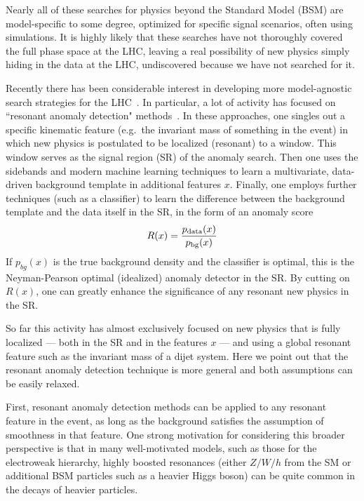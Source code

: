 \documentclass[prd, twocolumn, superscriptaddress,floatfix, nofootinbib, preprintnumbers]{revtex4-2}
\begin{document}
Nearly all of these searches for physics beyond the Standard Model (BSM) are model-specific to some degree, optimized for specific signal scenarios, often using simulations. It is highly likely that these searches have not thoroughly covered the full phase space at the LHC, leaving a real possibility of new physics simply hiding in the data at the LHC, undiscovered because we have not searched for it. 



Recently there has been considerable interest in developing more model-agnostic search strategies for the LHC~\cite{Karagiorgi:2021ngt,Kasieczka:2021xcg,Aarrestad:2021oeb}. In particular, a lot of activity has focused on ``resonant anomaly detection" methods~\cite{Collins:2018epr,Collins:2019jip,Nachman:2020lpy,Andreassen:2020nkr,Amram:2020ykb,ATLAS:2020iwa,Benkendorfer:2020gek,Stein:2020rou,Park:2020pak,Collins:2021nxn,Hallin:2021wme,Kamenik:2022qxs,Raine:2022hht,Kasieczka:2022naq,Hallin:2022eoq,Chen:2022suv,Golling:2022nkl,Golling:2023yjq,sengupta2023curtains}. 
In these approaches, one singles out a specific kinematic feature (e.g.\ the invariant mass of something in the event) in which new physics is postulated to be localized (resonant) to a window. This window serves as the signal region (SR) of the anomaly search. Then one uses the sidebands and modern machine learning techniques to learn a  multivariate, data-driven background template in additional features $x$. Finally, one employs further techniques (such as a classifier) to learn the difference between the background template and the data itself in the SR, in the form of an anomaly score 
\begin{equation}\label{eq:anomalyscore}
R(x) = \frac{p_{\rm data}(x)}{p_{\rm bg}(x)}
\end{equation}
If $p_{bg}(x)$ is the true background density and the classifier is optimal, this is the Neyman-Pearson optimal (idealized) anomaly detector in the SR. By cutting on $R(x)$, one can greatly enhance the significance of any resonant new physics in the SR. 

So far this activity has almost exclusively focused on new physics that is fully localized --- both in the SR and in the features $x$ --- and
using a global resonant feature such as the invariant mass of a dijet system.
Here we point out that the resonant anomaly detection technique is more general and both assumptions can be easily relaxed.

First, resonant anomaly detection methods can be applied to any resonant feature in the event, as long as the background satisfies the assumption of smoothness in that feature. One strong motivation for considering this broader perspective is that in many well-motivated models, such as those for the electroweak hierarchy, highly boosted resonances (either $Z/W/h$ from the SM or additional BSM particles such as a heavier Higgs boson)  can be quite common in the decays of heavier particles. 
\end{document}
